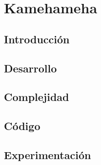 \section{Kamehameha}

	\subsection{Introducción}

	
    \subsection{Desarrollo}


    \subsection{Complejidad}


    \subsection{Código}


    \subsection{Experimentación}